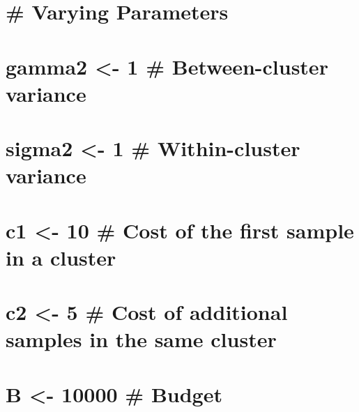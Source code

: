 \documentclass[
]{article}
\begin{document}
\hypertarget{section-28}{%
\section{}\label{section-28}}

\hypertarget{section-29}{%
\section{}\label{section-29}}

\hypertarget{varying-parameters}{%
\section{\# Varying Parameters}\label{varying-parameters}}

\hypertarget{gamma2---1-between-cluster-variance}{%
\section{gamma2 \textless- 1 \# Between-cluster
variance}\label{gamma2---1-between-cluster-variance}}

\hypertarget{sigma2---1-within-cluster-variance}{%
\section{sigma2 \textless- 1 \# Within-cluster
variance}\label{sigma2---1-within-cluster-variance}}

\hypertarget{c1---10-cost-of-the-first-sample-in-a-cluster}{%
\section{c1 \textless- 10 \# Cost of the first sample in a
cluster}\label{c1---10-cost-of-the-first-sample-in-a-cluster}}

\hypertarget{c2---5-cost-of-additional-samples-in-the-same-cluster}{%
\section{c2 \textless- 5 \# Cost of additional samples in the same
cluster}\label{c2---5-cost-of-additional-samples-in-the-same-cluster}}

\hypertarget{b---10000-budget}{%
\section{B \textless- 10000 \# Budget}\label{b---10000-budget}}
\end{document}
